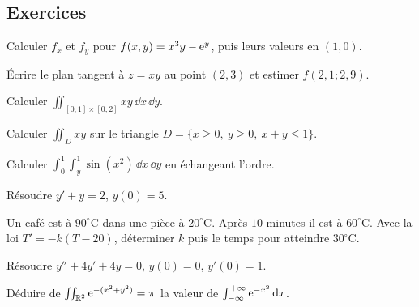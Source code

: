 \subsection{Exercices}
\begin{exo}[A]\label{c7e1}
Calculer $f_x$ et $f_y$ pour $f(x,y)=x^3y-\mathrm{e}^{y}$, puis leurs valeurs en $(1,0)$.
\end{exo}
\begin{exo}[A]\label{c7e2}
Écrire le plan tangent à $z=xy$ au point $(2,3)$ et estimer $f(2{,}1;2{,}9)$.
\end{exo}
\begin{exo}[A]\label{c7e3}
Calculer $\iint_{[0,1]\times[0,2]}xy\,\dd x\,\dd y$.
\end{exo}
\begin{exo}[B]\label{c7e4}
Calculer $\iint_Dxy$ sur le triangle $D=\{x\ge0,\ y\ge0,\ x+y\le1\}$.
\end{exo}
\begin{exo}[B]\label{c7e5}
Calculer $\int_0^1\int_y^1\sin(x^2)\,\dd x\,\dd y$ en échangeant l'ordre.
\end{exo}
\begin{exo}[B]\label{c7e6}
Résoudre $y'+y=2$, $y(0)=5$.
\end{exo}
\begin{exo}[C]\label{c7e7}
Un café est à $90^\circ$C dans une pièce à $20^\circ$C. Après $10$ minutes il est à $60^\circ$C. Avec la loi $T'=-k(T-20)$, déterminer $k$ puis le temps pour atteindre $30^\circ$C.
\end{exo}
\begin{exo}[C]\label{c7e8}
Résoudre $y''+4y'+4y=0$, $y(0)=0$, $y'(0)=1$.
\end{exo}
\begin{exo}[C]\label{c7e9}
Déduire de $\iint_{\mathbb{R}^2}\mathrm{e}^{-(x^2+y^2)}=\pi$ la valeur de $\int_{-\infty}^{+\infty}\mathrm{e}^{-x^2}\,\mathrm{d} x$.
\end{exo}

\ifcorr
